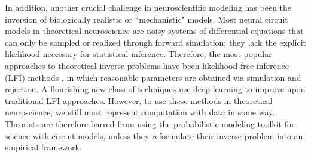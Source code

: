 \documentclass[11pt]{article}
\begin{document}
In addition, another crucial challenge in neuroscientific modeling has been the inversion of biologically realistic or ``mechanistic" models.
Most neural circuit models in theoretical neuroscience are noisy systems of differential equations that can only be sampled or realized through forward simulation; they lack the explicit likelihood necessary for statistical inference.
Therefore, the most popular approaches to theoretical inverse problems have been likelihood-free inference (LFI) methods \cite{sisson2007sequential, liepe2014framework}, in which reasonable parameters are obtained via simulation and rejection.
A flourishing new class of techniques \cite{gonccalves2019training, papamakarios2019sequential, hermans2020likelihood} use deep learning to improve upon traditional LFI approaches.
However, to use these methods in theoretical neuroscience, we still must represent computation with data in some way.
Theorists are therefore barred from using the probabilistic modeling toolkit for science with circuit models, unless they reformulate their inverse problem into an empirical framework.

%
\end{document}
